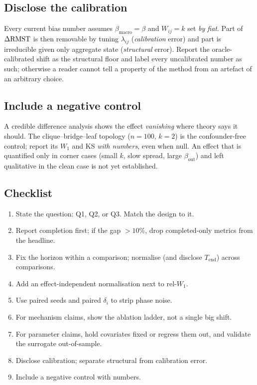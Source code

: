 \documentclass[11pt,a4paper]{article}
\begin{document}
\subsection{Disclose the calibration}
\label{sec:calib}

Every current bias number assumes $\beta_{\mathrm{macro}}=\beta$ and
$W_{ij}=k$ set \emph{by fiat}.  Part of $\Delta\mathrm{RMST}$ is then removable by tuning
$\lambda_{ij}$ (\emph{calibration} error) and part is irreducible given only
aggregate state (\emph{structural} error).  Report the oracle-calibrated shift
as the structural floor and label every uncalibrated number as such; otherwise a
reader cannot tell a property of the method from an artefact of an arbitrary
choice.

\subsection{Include a negative control}
\label{sec:negctrl}

A credible difference analysis shows the effect \emph{vanishing} where theory
says it should.  The clique--bridge--leaf topology ($n=100$, $k=2$) is the
confounder-free control; report its $W_1$ and KS \emph{with numbers}, even when
null.  An effect that is quantified only in corner cases (small $k$, slow
spread, large $\beta_{\mathrm{out}}$) and left qualitative in the clean case is
not yet established.

\subsection{Checklist}

\begin{enumerate}
  \item State the question: Q1, Q2, or Q3.  Match the design to it.
  \item Report completion first; if the gap $>10\%$, drop completed-only metrics
        from the headline.
  \item Fix the horizon within a comparison; normalise (and disclose $T_{\mathrm{end}}$)
        across comparisons.
  \item Add an effect-independent normalisation next to rel-$W_1$.
  \item Use paired seeds and paired $\delta_i$ to strip phase noise.
  \item For mechanism claims, show the ablation ladder, not a single big shift.
  \item For parameter claims, hold covariates fixed or regress them out, and
        validate the surrogate out-of-sample.
  \item Disclose calibration; separate structural from calibration error.
  \item Include a negative control with numbers.
\end{enumerate}
\end{document}
